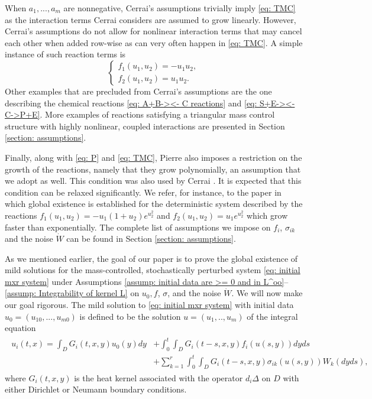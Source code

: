 \documentclass[12pt]{article}
\theoremstyle{definition}
\theoremstyle{remark}
\begin{document}
When $a_1,...,a_m$ are nonnegative, Cerrai's assumptions \cite{cerrai2003stochastic} trivially imply \eqref{eq: TMC} as the interaction terms Cerrai considers are assumed to grow linearly. However, Cerrai's assumptions do not allow for nonlinear interaction terms that may cancel each other when added row-wise as can very often happen in \eqref{eq: TMC}. A simple instance of such reaction terms is
\begin{equation*}\label{eq: prototypical example}
\begin{cases}
    f_1(u_1,u_2)= -u_1u_2,\\
    f_2(u_1,u_2)= u_1u_2.
\end{cases}
    \end{equation*}
Other examples that are precluded from Cerrai's assumptions are the one describing the chemical reactions \eqref{eq: A+B-><- C reactions} and \eqref{eq: S+E-><-C->P+E}. More examples of reactions satisfying a triangular mass control structure with highly nonlinear, coupled interactions are presented in Section \ref{section: assumptions}. 

Finally, along with \eqref{eq: P} and \eqref{eq: TMC}, Pierre also imposes a restriction on the growth of the reactions, namely that they grow polynomially, an assumption that we adopt as well. This condition was also used by Cerrai \cite{cerrai2003stochastic}. It is expected that this condition can be relaxed significantly. We refer, for instance, to the paper \cite{exponentialreact} in which global existence is established for the deterministic system described by the reactions $f_1(u_1,u_2) = -u_1(1+u_2)e^{u_2^2}$ and $ f_2(u_1,u_2) = u_1e^{u_2^2}$ which grow faster than exponentially. The complete list of assumptions we impose on $f_i$, $\sigma_{ik}$ and the noise $\dot{W}$ can be found in Section \ref{section: assumptions}.

As we mentioned earlier, the goal of our paper is to prove the global existence of mild solutions for the mass-controlled, stochastically perturbed system \eqref{eq: initial mxr system} under Assumptions \ref{assump: initial data are >= 0 and in L^oo}--\ref{assump: Integrability of kernel L} on $u_0,f$, $\sigma$, and the noise $\dot{W}$. We will now make our goal rigorous. The mild solution to \eqref{eq: initial mxr system} with initial data $u_0 = (u_{10},...,u_{m0})$ is defined to be the solution $u=(u_1,..,u_m)$ of the integral equation
\begin{align}\label{eq: definition mild solution}
\begin{split}
    u_i(t,x) = \int_D G_i(t,x,y)u_0(y)dy &+ \int_0^t\int_D G_i(t-s,x,y)f_i(u(s,y))dyds\\
    &+\sum_{k=1}^r\int_0^t\int_D G_i(t-s,x,y)\sigma_{ik}(u(s,y))W_k(dyds),
\end{split}
\end{align}
where $G_i(t,x,y)$ is the heat kernel associated with the operator $d_i\Delta$ on $D$ with either Dirichlet or Neumann boundary conditions.
\end{document}
